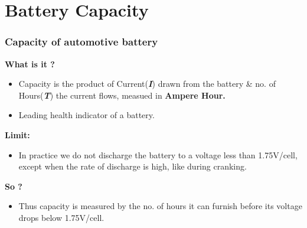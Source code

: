 \documentclass{beamer}
\begin{document}
  

\section{Battery Capacity}

\begin{frame}     %
  \frametitle{Capacity of automotive battery}
  \fontsize{9pt}{14}\selectfont
  
  \textbf{What is it ?}
  \begin{itemize}
    \item Capacity is the product of Current(\textbf{\textit{I}}) drawn from the battery \& no. of Hours(\textbf{\textit{T}}) the current flows, measued in \textbf{Ampere Hour.}
    \item Leading health indicator of a battery.
  \end{itemize}
  
  \textbf{Limit:}
  \begin{itemize}
    \item In practice we do not discharge the battery to a voltage less than 1.75V/cell, except when the rate of discharge is high, like during cranking.
  \end{itemize}
  
  \textbf{So ?}
  \begin{itemize}
    \item Thus capacity is measured by the no. of hours it can furnish before its voltage drops below 1.75V/cell.
  \end{itemize}  
\end{frame}
\end{document}
